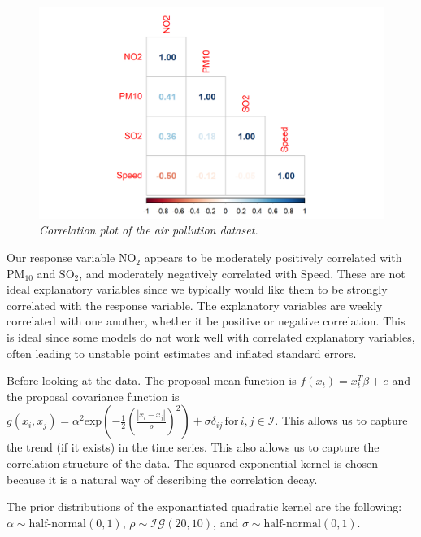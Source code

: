 \documentclass[a4paper, 10pt]{article}
\begin{document}
\begin{flushleft}
      \begin{figure}[H]
         \centering
         \includegraphics[width=0.48\linewidth]{../img/corrplot.png}
         \caption{\textit{Correlation plot of the air pollution dataset.}}
      \end{figure}

      Our response variable $\text{NO}_{2}$ appears to be moderately positively correlated with $\text{PM}_{10}$ and $\text{SO}_{2}$, and moderately negatively correlated with Speed. These are not ideal explanatory variables since we typically would like them to be strongly correlated with the response variable. The explanatory variables are weekly correlated with one another, whether it be positive or negative correlation. This is ideal since some models do not work well with correlated explanatory variables, often leading to unstable point estimates and inflated standard errors.

      \vspace{1em}

      Before looking at the data. The proposal mean function is $f(x_{t}) = x_{t}^{T} \beta + e$ and the proposal covariance function is $g(x_{i}, x_{j}) = \alpha^{2} \text{exp}(- \frac{1}{2} (\frac{|x_i - x_j|}{\rho})^2) + \sigma\delta_{ij} \, \text{for} \, i,j \in \mathcal{I}$. This allows us to capture the trend (if it exists) in the time series. This also allows us to capture the correlation structure of the data. The squared-exponential kernel is chosen because it is a natural way of describing the correlation decay.

      \vspace{1em}

      The prior distributions of the exponantiated quadratic kernel are the following: $\alpha \sim \text{half-normal}(0, 1)$, $\rho \sim \mathcal{IG}(20, 10)$, and $\sigma \sim \text{half-normal}(0, 1)$.


\end{flushleft}
\end{document}
